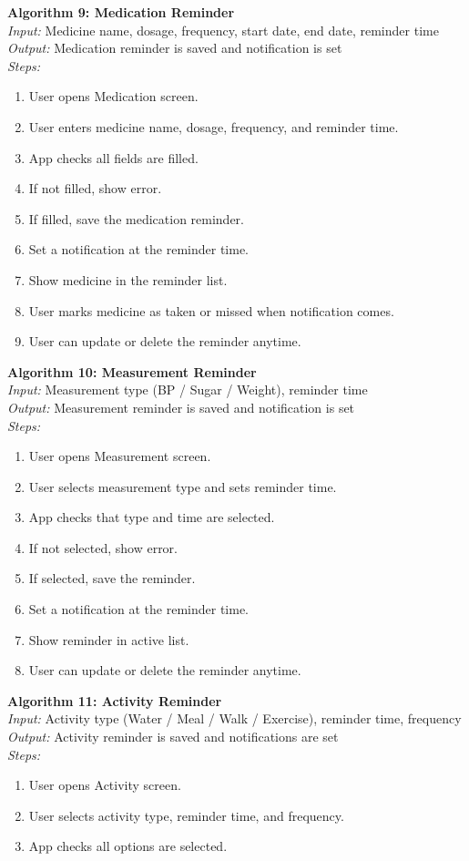 \textbf{Algorithm 9: Medication Reminder}\\
\textit{Input:} Medicine name, dosage, frequency, start date, end date, reminder time\\
\textit{Output:} Medication reminder is saved and notification is set\\
\textit{Steps:}
\begin{enumerate}
    \item User opens Medication screen.
    \item User enters medicine name, dosage, frequency, and reminder time.
    \item App checks all fields are filled.
    \item If not filled, show error.
    \item If filled, save the medication reminder.
    \item Set a notification at the reminder time.
    \item Show medicine in the reminder list.
    \item User marks medicine as taken or missed when notification comes.
    \item User can update or delete the reminder anytime.
\end{enumerate}

\textbf{Algorithm 10: Measurement Reminder}\\
\textit{Input:} Measurement type (BP / Sugar / Weight), reminder time\\
\textit{Output:} Measurement reminder is saved and notification is set\\
\textit{Steps:}
\begin{enumerate}
    \item User opens Measurement screen.
    \item User selects measurement type and sets reminder time.
    \item App checks that type and time are selected.
    \item If not selected, show error.
    \item If selected, save the reminder.
    \item Set a notification at the reminder time.
    \item Show reminder in active list.
    \item User can update or delete the reminder anytime.
\end{enumerate}

\textbf{Algorithm 11: Activity Reminder}\\
\textit{Input:} Activity type (Water / Meal / Walk / Exercise), reminder time, frequency\\
\textit{Output:} Activity reminder is saved and notifications are set\\
\textit{Steps:}
\begin{enumerate}
    \item User opens Activity screen.
    \item User selects activity type, reminder time, and frequency.
    \item App checks all options are selected.
\end{enumerate}

